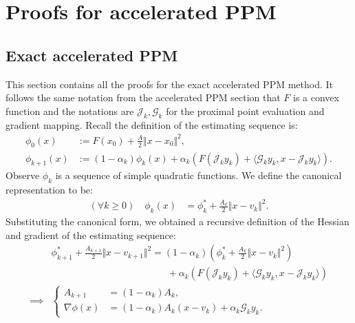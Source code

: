 \documentclass[12pt]{article}
\begin{document}
    
\section{Proofs for accelerated PPM}
    \subsection{Exact accelerated PPM}\label{sec:app:exct-acc-ppm}
        This section contains all the proofs for the exact accelerated PPM method. 
        It follows the same notation from the accelerated PPM section that $F$ is a convex function and the notations are $\mathcal J_k, \mathcal G_k$ for the proximal point evaluation and gradient mapping. 
        Recall the definition of the estimating sequence is: 
        \begin{align*}
            \phi_0(x) &:= F(x_0) + \frac{A}{2}\Vert x - x_0\Vert^2, 
            \\
            \phi_{k + 1}(x) &:= 
            (1 - \alpha_k)\phi_k(x)
            + 
            \alpha_k(F(\mathcal J_k y_k) + \langle \mathcal G_k y_k, x - \mathcal J_k y_k\rangle). 
        \end{align*}
        Observe $\phi_k$ is a sequence of simple quadratic functions. 
        We define the canonical representation to be: 
        \begin{align*}
            (\forall k \ge 0) \quad 
            \phi_k(x) &= \phi_k^* + \frac{A_k}{2} \Vert x - v_k\Vert^2. 
        \end{align*}
        Substituting the canonical form, we obtained a recursive definition of the Hessian and gradient of the estimating sequence: 
        \begin{align*}
            &
            \phi_{k+ 1}^* + \frac{A_{k + 1}}{2}\Vert x - v_{k + 1}\Vert^2
            = 
            (1 - \alpha_k)
            \left(\phi_k^* + \frac{A_k}{2}\Vert x - v_k\Vert^2\right)
            \\ & \hspace{12em}
                + 
                \alpha_k(F(\mathcal J_k y_k) + \langle \mathcal G_k y_k, x - \mathcal J_k y_k\rangle)
            \\
            \implies 
            &
            \left\lbrace
            \begin{aligned}
                A_{k + 1} 
                &= (1 - \alpha_k)A_k, 
                \\
                \nabla \phi(x)
                &= 
                (1 - \alpha_k)A_k(x - v_k) + \alpha_k \mathcal G_ky_k. 
            \end{aligned}
            \right.
        \end{align*}
\end{document}
